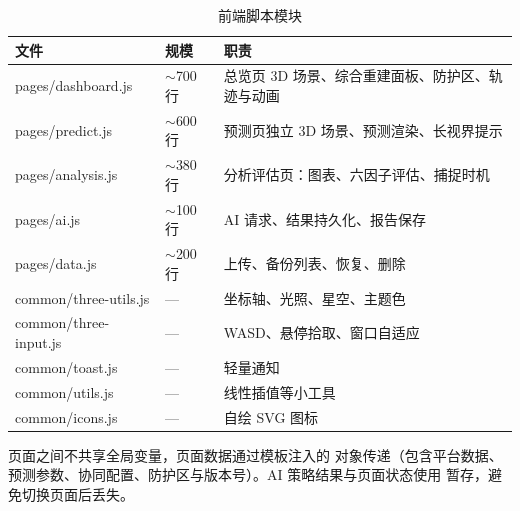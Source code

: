 \begin{table}[H]
\centering
\caption{前端脚本模块}
\label{tab:frontjs}
\small
\begin{tabularx}{\linewidth}{@{}>{\ttfamily\scriptsize}p{3.6cm}>{\scriptsize}p{2.2cm}>{\raggedright\arraybackslash}X@{}}
\toprule
文件 & 规模 & 职责 \\
\midrule
pages/dashboard.js & $\sim$700 行 & 总览页 3D 场景、综合重建面板、防护区、轨迹与动画 \\
pages/predict.js & $\sim$600 行 & 预测页独立 3D 场景、预测渲染、长视界提示 \\
pages/analysis.js & $\sim$380 行 & 分析评估页：图表、六因子评估、捕捉时机 \\
pages/ai.js & $\sim$100 行 & AI 请求、结果持久化、报告保存 \\
pages/data.js & $\sim$200 行 & 上传、备份列表、恢复、删除 \\
common/three-utils.js & --- & 坐标轴、光照、星空、主题色 \\
common/three-input.js & --- & WASD、悬停拾取、窗口自适应 \\
common/toast.js & --- & 轻量通知 \\
common/utils.js & --- & 线性插值等小工具 \\
common/icons.js & --- & 自绘 SVG 图标 \\
\bottomrule
\end{tabularx}
\end{table}

页面之间不共享全局变量，页面数据通过模板注入的  对象传递（包含平台数据、预测参数、协同配置、防护区与版本号）。AI 策略结果与页面状态使用  暂存，避免切换页面后丢失。
